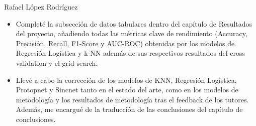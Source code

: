 \begin{contribucion}{Rafael López Rodríguez}
\begin{itemize}
	\item Completé la subsección de datos tabulares dentro del capítulo de Resultados del proyecto, añadiendo todas las métricas clave de rendimiento (Accuracy, Precisión, Recall, F1-Score y AUC-ROC) obtenidas por los modelos de Regresión Logística y k-NN además de sus respectivos resultados del cross validation y el grid search.
	
	\item Llevé a cabo la corrección de los modelos de KNN, Regresión Logística, Protopnet y Sincnet tanto en el estado del arte, como en los modelos de metodología y los resultados de metodología tras el feedback de los tutores. Además, me encargué de la traducción de las conclusiones del capítulo de conclusiones.

\end{itemize}
\end{contribucion}
